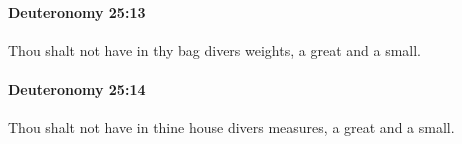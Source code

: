 		\paragraph{Deuteronomy 25:13} %
			\label{DEUTERONOMY-25-13}

			Thou shalt not have in thy bag divers weights, a great and a small.


		\paragraph{Deuteronomy 25:14} %
			\label{DEUTERONOMY-25-14}

			Thou shalt not have in thine house divers measures, a great and a small.


